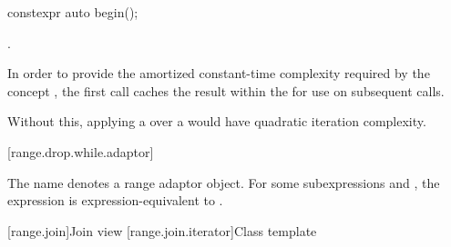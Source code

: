 \documentclass{wg21}
\begin{document}
%
\begin{itemdecl}
constexpr auto begin();


\end{itemdecl}

\begin{itemdescr}
\pnum
\returns
{}.

\pnum
\remarks
In order to provide the amortized constant-time complexity
required by the  concept
,
the first call caches the result within the 
for use on subsequent calls.
\begin{note}
	Without this,
	applying a  over a 
	would have quadratic iteration complexity.
\end{note}
\end{itemdescr}

[range.drop.while.adaptor]{}

\pnum
The name 
denotes a range adaptor object.
For some subexpressions  and ,
the expression 
is expression-equivalent to .

[range.join]{Join view}
[range.join.iterator]{Class template }
\end{document}
